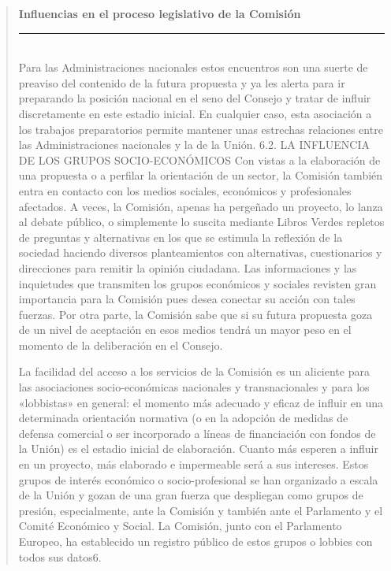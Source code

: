 \documentclass[10pt,a4paper]{article}
\newenvironment{specialblock}[1]{%
      \begin{quote} %
      \small %
      \noindent\textbf{#1}\\[-0.3em] %
      \rule{\linewidth}{0.4pt}\\[0.6em]}{
      \end{quote}}
\begin{document}
\begin{specialblock}{\textbf{Influencias en el proceso legislativo de la Comisión}}
Para las Administraciones nacionales estos encuentros son una suerte de preaviso del contenido de la futura propuesta y ya les alerta para ir preparando la posición nacional en el seno del Consejo y tratar de influir discretamente en este estadio inicial. En cualquier caso, esta asociación a los trabajos preparatorios permite mantener unas estrechas relaciones entre las Administraciones nacionales y la de la Unión.
6.2. LA INFLUENCIA DE LOS GRUPOS SOCIO-ECONÓMICOS
Con vistas a la elaboración de una propuesta o a perfilar la orientación de un sector, la Comisión también entra en contacto con los medios sociales, económicos y profesionales afectados. A veces, la Comisión, apenas ha pergeñado un proyecto, lo lanza al debate público, o simplemente lo suscita mediante Libros Verdes repletos de preguntas y alternativas en los que se estimula la reflexión de la sociedad haciendo diversos planteamientos con alternativas, cuestionarios y direcciones para remitir la opinión ciudadana. Las informaciones y las inquietudes que transmiten los grupos económicos y sociales revisten gran importancia para la Comisión pues desea conectar su acción con tales fuerzas. Por otra parte, la Comisión sabe que si su futura propuesta goza de un nivel de aceptación en esos medios tendrá un mayor peso en el momento de la deliberación en el Consejo. 

La facilidad del acceso a los servicios de la Comisión es un aliciente para las asociaciones socio-económicas nacionales y transnacionales y para los «lobbistas» en general: el momento más adecuado y eficaz de influir en una determinada orientación normativa (o en la adopción de medidas de defensa comercial o ser incorporado a líneas de financiación con fondos de la Unión) es el estadio inicial de elaboración. Cuanto más esperen a influir en un proyecto, más elaborado e impermeable será a sus intereses. Estos grupos de interés económico o socio-profesional se han organizado a escala de la Unión y gozan de una gran fuerza que despliegan como grupos de presión, especialmente, ante la Comisión y también ante el Parlamento y el Comité Económico y Social. La Comisión, junto con el Parlamento Europeo, ha establecido un registro público de estos grupos o lobbies con todos sus datos6.


\end{specialblock}
\end{document}
